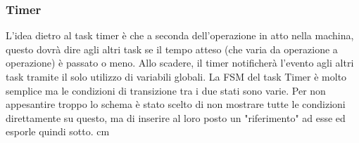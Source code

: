 \documentclass{article}
\begin{document}
\subsubsection{Timer}
L'idea dietro al task timer è che a seconda dell'operazione in atto nella machina, questo dovrà dire agli altri task se il tempo atteso (che varia da operazione a operazione) è passato o meno. Allo scadere, il timer notificherà l'evento agli altri task tramite il solo utilizzo di variabili globali. \newline
La FSM del task Timer è molto semplice ma le condizioni di transizione tra i due stati sono varie. Per non appesantire troppo lo schema è stato scelto di non mostrare tutte le condizioni direttamente su questo, ma di inserire al loro posto un "riferimento" ad esse ed esporle quindi sotto.
 cm
\begin{center}
\end{center}

\newpage

\end{document}
